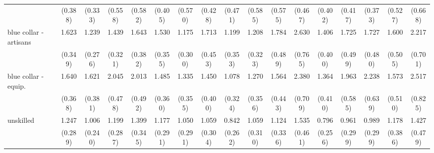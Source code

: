 {\begin{tabular}{l*{16}{c}}
                    &     (0.388)         &     (0.333)         &     (0.558)         &     (0.582)         &     (0.405)         &     (0.570)         &     (0.428)         &     (0.471)         &     (0.585)         &     (0.575)         &     (0.467)         &     (0.402)         &     (0.417)         &     (0.373)         &     (0.527)         &     (0.668)         \\
[1em]
blue collar - artisans&       1.623\sym{*}  &       1.239         &       1.439         &       1.643\sym{*}  &       1.530         &       1.175         &       1.713\sym{*}  &       1.199         &       1.208         &       1.784\sym{*}  &       2.630\sym{***}&       1.406         &       1.725         &       1.727\sym{*}  &       1.600         &       2.217\sym{*}  \\
                    &     (0.349)         &     (0.276)         &     (0.321)         &     (0.382)         &     (0.355)         &     (0.300)         &     (0.453)         &     (0.353)         &     (0.323)         &     (0.489)         &     (0.765)         &     (0.400)         &     (0.499)         &     (0.480)         &     (0.505)         &     (0.701)         \\
[1em]
blue collar - equip.&       1.640\sym{*}  &       1.621\sym{*}  &       2.045\sym{**} &       2.013\sym{**} &       1.485         &       1.335         &       1.450         &       1.078         &       1.270         &       1.564         &       2.380\sym{**} &       1.364         &       1.963\sym{*}  &       2.238\sym{**} &       1.573         &       2.517\sym{**} \\
                    &     (0.368)         &     (0.381)         &     (0.478)         &     (0.492)         &     (0.360)         &     (0.355)         &     (0.400)         &     (0.324)         &     (0.356)         &     (0.443)         &     (0.709)         &     (0.410)         &     (0.585)         &     (0.639)         &     (0.510)         &     (0.825)         \\
[1em]
unskilled           &       1.247         &       1.006         &       1.199         &       1.399         &       1.177         &       1.050         &       1.059         &       0.842         &       1.059         &       1.124         &       1.535         &       0.796         &       0.961         &       0.989         &       1.178         &       1.427         \\
                    &     (0.289)         &     (0.240)         &     (0.287)         &     (0.345)         &     (0.291)         &     (0.291)         &     (0.304)         &     (0.262)         &     (0.310)         &     (0.336)         &     (0.461)         &     (0.256)         &     (0.299)         &     (0.299)         &     (0.386)         &     (0.479)         \\

\end{tabular}}
